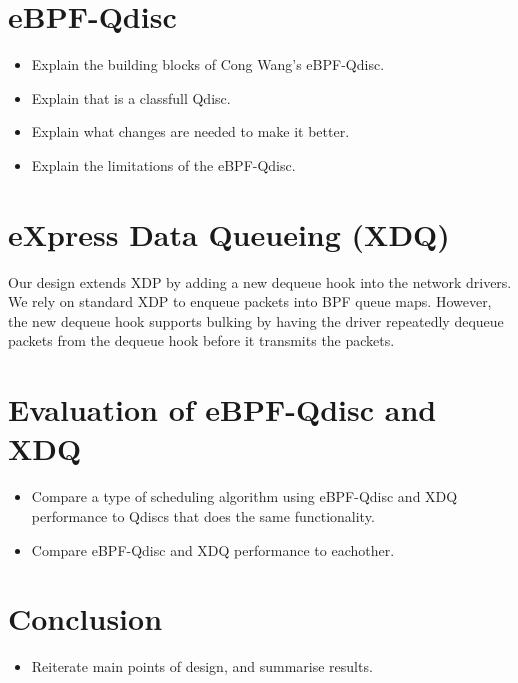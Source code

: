 \documentclass[sigconf, nonacm]{acmart}
\begin{document}
\section{eBPF-Qdisc}

\begin{itemize}
  \item Explain the building blocks of Cong Wang's eBPF-Qdisc.
  \item Explain that is a classfull Qdisc.
  \item Explain what changes are needed to make it better.
  \item Explain the limitations of the eBPF-Qdisc.
\end{itemize}


\section{eXpress Data Queueing (XDQ)}


Our design extends XDP by adding a new dequeue hook into the network drivers. We
rely on standard XDP to enqueue packets into BPF queue maps. However, the new
dequeue hook supports bulking by having the driver repeatedly dequeue packets
from the dequeue hook before it transmits the packets.


\section{Evaluation of eBPF-Qdisc and XDQ}

\begin{itemize}
  \item Compare a type of scheduling algorithm using eBPF-Qdisc and XDQ performance to Qdiscs that does the same functionality.
  \item Compare eBPF-Qdisc and XDQ performance to eachother.
\end{itemize}

\section{Conclusion}

\begin{itemize}
  \item Reiterate main points of design, and summarise results.
\end{itemize}





\end{document}
